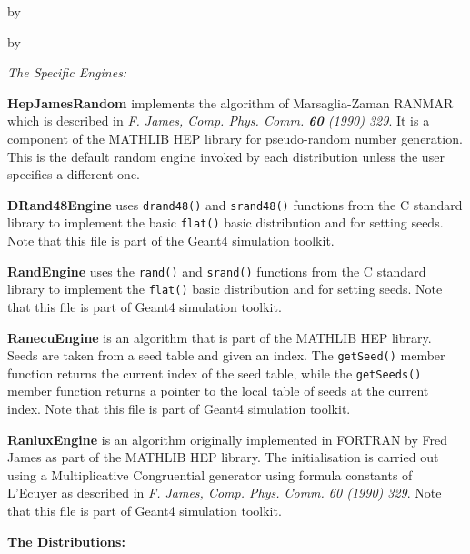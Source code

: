 \documentclass[twoside]{article}
\newcommand{\comp}[1]{\texttt{#1}}%
\newcommand{\entrylabel}[1]{\mbox{\textbf{{#1}}}\hfil}%
\newenvironment{entry}
{\begin{list}{}%
    {\renewcommand{\makelabel}{\entrylabel}%
     \setlength{\labelwidth}{90pt}%
     \setlength{\leftmargin}{\labelwidth}
     \advance\leftmargin by \labelsep%
      }%
    }%
  {\end{list}}
\newcommand{\Entrylabel}[1]%
{\raisebox{0pt}[1ex][0pt]{\makebox[\labelwidth][l]%
    {\parbox[t]{\labelwidth}{\hspace{0pt}\textbf{{#1}}}}}}
\newenvironment{Entry}%
{\renewcommand{\entrylabel}{\Entrylabel}\begin{entry}}%
  {\end{entry}}
\begin{document}
\begin{description}
\begin{Entry}
\begin{Entry}
     {\em The Specific Engines:}
     
     \begin{description}
       \item {\bf HepJamesRandom} implements the algorithm of
       Marsaglia-Zaman RANMAR which is described in
       {\em F.  James, Comp. Phys. Comm. {\bf 60} (1990) 329}.  It is a
       component of the MATHLIB HEP library for pseudo-random
       number generation.  This is the default random engine invoked
       by each distribution unless the user specifies a different one.

       \item {\bf DRand48Engine} uses \comp{drand48()}
         and \comp{srand48()} functions from the C standard library
         to implement the basic \comp{flat()} basic distribution and
         for setting seeds.  Note that this file is part of the
         Geant4  simulation toolkit.

       \item {\bf RandEngine} uses the \comp{rand()} and \comp{srand()}
         functions from the C standard library to implement the \comp{flat()}
         basic distribution and for setting seeds.  Note that this file is
         part of Geant4 simulation toolkit.

       \item {\bf RanecuEngine} is an algorithm that is part of the
         MATHLIB HEP library.  Seeds are taken from a seed table
         and given an index.  The \comp{getSeed()} member function
         returns the current index of the seed table, while the
         \comp{getSeeds()} member function returns a pointer to the
         local table of seeds at the current index.  Note that this file
         is part of Geant4 simulation toolkit.

       \item {\bf RanluxEngine} is an algorithm originally implemented
         in FORTRAN by Fred James as part of the MATHLIB HEP
         library.  The initialisation is carried out using a
         Multiplicative Congruential generator using formula constants
         of L'Ecuyer as described in {\em F. James, Comp. Phys. Comm. 60 (1990) 329}.
         Note that this file is part of Geant4 simulation toolkit.
     \end{description}

  {\bf The Distributions:}
  

\end{Entry}
\end{Entry}
\end{description}
\end{document}
